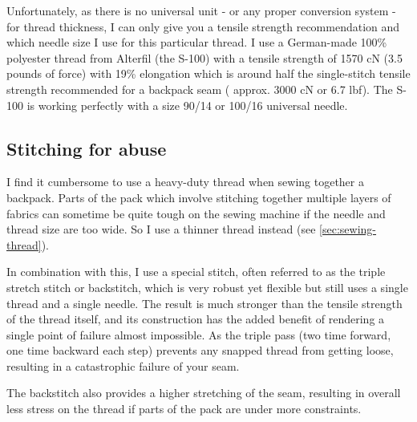 Unfortunately, as there is no universal unit - or any proper conversion system - for thread thickness, I can only give you a tensile strength recommendation and which needle size I use for this particular thread. I use a German-made 100\% polyester thread from Alterfil (the S-100) with a tensile strength of 1570 cN (3.5 pounds of force) with 19\% elongation which is around half the single-stitch tensile strength recommended for a backpack seam ( approx. 3000 cN or 6.7 lbf). The S-100 is working perfectly with a size 90/14 or 100/16 universal needle.



\subsection{Stitching for abuse} \label{sec:stitching-for-abuse}

I find it cumbersome to use a heavy-duty thread when sewing together a backpack. Parts of the pack which involve stitching together multiple layers of fabrics can sometime be quite tough on the sewing machine if the needle and thread size are too wide. So I use a thinner thread instead (see \ref{sec:sewing-thread}).

In combination with this, I use a special stitch, often referred to as the triple stretch stitch or backstitch, which is very robust yet flexible but still uses a single thread and a single needle. The result is much stronger than the tensile strength of the thread itself, and its construction has the added benefit of rendering a single point of failure almost impossible. As the triple pass (two time forward, one time backward each step) prevents any snapped thread from getting loose, resulting in a catastrophic failure of your seam.

The backstitch also provides a higher stretching of the seam, resulting in overall less stress on the thread if parts of the pack are under more constraints.
